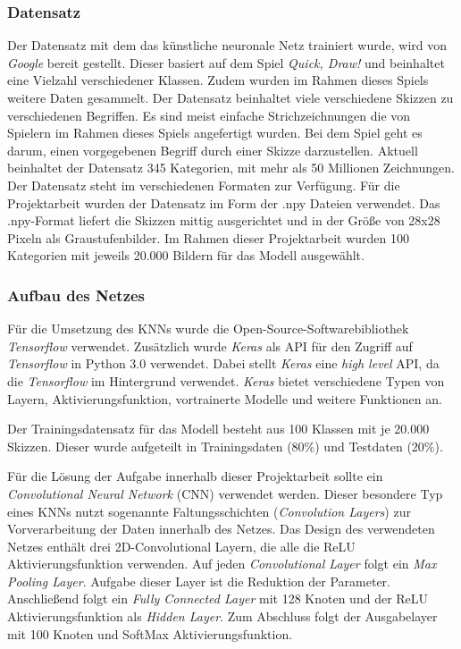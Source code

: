 \documentclass[11pt]{article}
\begin{document}
\subsubsection{Datensatz}
Der Datensatz mit dem das künstliche neuronale Netz trainiert wurde, wird von \textit{Google} bereit gestellt. Dieser basiert auf dem Spiel \textit{Quick, Draw!} und beinhaltet eine Vielzahl verschiedener Klassen.  Zudem wurden im Rahmen dieses Spiels weitere Daten gesammelt. Der Datensatz beinhaltet viele verschiedene Skizzen zu verschiedenen Begriffen. Es sind meist einfache Strichzeichnungen die von Spielern im Rahmen dieses Spiels angefertigt wurden. Bei dem Spiel geht es darum, einen vorgegebenen Begriff durch einer Skizze darzustellen. Aktuell beinhaltet der Datensatz 345 Kategorien, mit mehr als 50 Millionen Zeichnungen. Der Datensatz steht im verschiedenen Formaten zur Verfügung.
Für die Projektarbeit wurden der Datensatz im Form der .npy Dateien verwendet. Das .npy-Format liefert die Skizzen mittig ausgerichtet und in der Größe von 28x28 Pixeln als Graustufenbilder.\parencite{GoogleCreativeLab2018}
Im Rahmen dieser Projektarbeit wurden 100 Kategorien mit jeweils 20.000 Bildern für das Modell ausgewählt.

\subsubsection{Aufbau des Netzes}
Für die Umsetzung des KNNs wurde die Open-Source-Softwarebibliothek \textit{Tensorflow} verwendet. Zusätzlich wurde \textit{Keras} als API für den Zugriff auf \textit{Tensorflow} in Python 3.0 verwendet. Dabei stellt \textit{Keras} eine \textit{high level} API, da die \textit{Tensorflow} im Hintergrund verwendet. \textit{Keras} bietet verschiedene Typen von Layern, Aktivierungsfunktion, vortrainerte Modelle und weitere Funktionen an.

Der Trainingsdatensatz für das Modell besteht aus 100 Klassen mit je 20.000 Skizzen. Dieser wurde aufgeteilt in Trainingsdaten (80\%) und Testdaten (20\%).

Für die Lösung der Aufgabe innerhalb dieser Projektarbeit sollte  ein \textit{Convolutional Neural Network} (CNN) verwendet werden. Dieser besondere Typ eines KNNs nutzt sogenannte Faltungsschichten (\textit{Convolution Layers}) zur Vorverarbeitung der Daten innerhalb des Netzes.
Das Design des verwendeten Netzes enthält drei 2D-Convolutional Layern, die alle die ReLU Aktivierungsfunktion verwenden. Auf jeden \textit{Convolutional Layer} folgt ein \textit{Max Pooling Layer}. Aufgabe dieser Layer ist die Reduktion der Parameter. Anschließend folgt ein \textit{Fully Connected Layer} mit 128 Knoten und der ReLU Aktivierungsfunktion als \textit{Hidden Layer}. Zum Abschluss folgt der Ausgabelayer mit 100 Knoten und SoftMax Aktivierungsfunktion.
\end{document}
